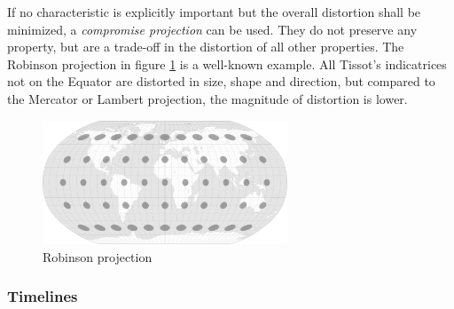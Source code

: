 If no characteristic is explicitly important but the overall distortion shall be minimized, a \emph{compromise projection} can be used. They do not preserve any property, but are a trade-off in the distortion of all other properties. The Robinson projection in figure \ref{fig:robinson_projection} is a well-known example. All Tissot's indicatrices not on the Equator are distorted in size, shape and direction, but compared to the Mercator or Lambert projection, the magnitude of distortion is lower.

\begin{figure}[ht]
  \centering
  \includegraphics[width=0.65\textwidth]{graphics/basics/projection_distortion_robinson.png}
  \caption{Robinson projection \protect\footnotemark}
  \label{fig:robinson_projection}
\end{figure}




\subsubsection{Timelines} %
\label{ssub:timelines}



